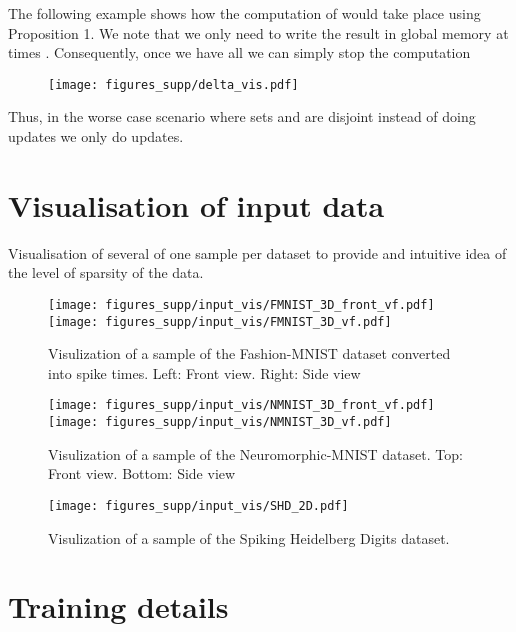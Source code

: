 \documentclass{article}
\begin{document}
The following example shows how the computation of  would take place using Proposition 1. We note that we only need to write the result in global memory at times . Consequently, once we have all  we can simply stop the computation

\begin{figure}[!h]
\centering 
\texttt{[image: figures\_supp/delta\_vis.pdf]}
\label{fig:delta_vis}
\end{figure}



Thus, in the worse case scenario where sets  and  are disjoint instead of doing  updates we only do  updates.

\section{Visualisation of input data} \label{supp:dataset_vis}
Visualisation of several of one sample per dataset to provide and intuitive idea of the level of sparsity of the data.  

\begin{figure}[!ht]
\centering 
\texttt{[image: figures\_supp/input\_vis/FMNIST\_3D\_front\_vf.pdf]}\texttt{[image: figures\_supp/input\_vis/FMNIST\_3D\_vf.pdf]}
\caption{Visulization of a sample of the Fashion-MNIST dataset converted into spike times. Left: Front view. Right: Side view}
\label{fig:supp_fmnist}
\end{figure}

\begin{figure}[!ht]
\centering 
\texttt{[image: figures\_supp/input\_vis/NMNIST\_3D\_front\_vf.pdf]}
\vspace{0.5cm}
\texttt{[image: figures\_supp/input\_vis/NMNIST\_3D\_vf.pdf]}
\caption{Visulization of a sample of the Neuromorphic-MNIST dataset. Top: Front view. Bottom: Side view}
\label{fig:supp_nmnist}
\end{figure}

\begin{figure}[!ht]
\centering 
\texttt{[image: figures\_supp/input\_vis/SHD\_2D.pdf]}
\caption{Visulization of a sample of the Spiking Heidelberg Digits dataset.}
\label{fig:supp_shd}
\end{figure}


\section{Training details} \label{supp:training_details}
\end{document}

